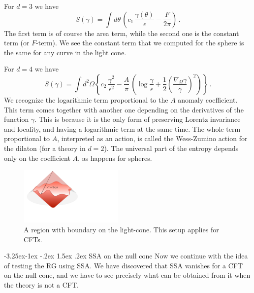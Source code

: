 \documentclass[11pt,a4paper]{article}
\makeatletter
\renewcommand\subsection{\@startsection{subsection}{2}{\z@}%
                                   {-3.25ex\@plus -1ex \@minus -.2ex}%
                                     {1.5ex \@plus .2ex}%
                                     {\normalfont\bfseries}}
\numberwithin{equation}{section}
\newcommand{\be}{\begin{equation}}
\newcommand{\ee}{\end{equation}}
\makeatother
\begin{document}
For $d=3$ we have 
\be
S(\gamma)=\int d\theta\,\left (c_1\, \frac{\gamma(\theta)}{\epsilon} -\frac{F}{2\pi} \right)\,.\label{tresd}
\ee
The first term is of course the area term, while the second one is the constant term (or $F$-term). We see the constant term that we computed for the sphere is the same for any curve in the light cone. 

For $d=4$ we have
\be
S(\gamma) = \int d^2 \Omega \left \lbrace  c_2\, \frac{\gamma^2}{\epsilon^2}- \frac{A}{\pi} \,  \left(\log \frac{\gamma}{\epsilon} + \frac{1}{2}\left(\frac{\nabla_\Omega \gamma}{\gamma} \right)^2 \right) \right \rbrace\,.\label{cuatrod}
\ee
We recognize the logarithmic term proportional to the $A$ anomaly coefficient. This term comes together with another one depending on the derivatives of the function $\gamma$. This is because it is the only form of preserving Lorentz invariance and locality, and having a logarithmic term at the same time. The whole term proportional to $A$, interpreted as an action, is called the Wess-Zumino action for the dilaton (for a theory in $d=2$). The universal part of the entropy depends only on the coefficient $A$, as happens for spheres.   

\begin{figure}[t]
\begin{center}
\includegraphics[width=0.45\textwidth]{nullcone.pdf} 
\caption{A region with boundary on the light-cone. This setup applies for CFTs.}
\label{rmenos}
\end{center}
\end{figure}

\subsection{SSA on the null cone}
Now we continue with the idea of testing the RG using SSA. We have discovered that SSA vanishes for a CFT on the null cone, and we have to see precisely what can be obtained from it when the theory is not a CFT. 
\end{document}
